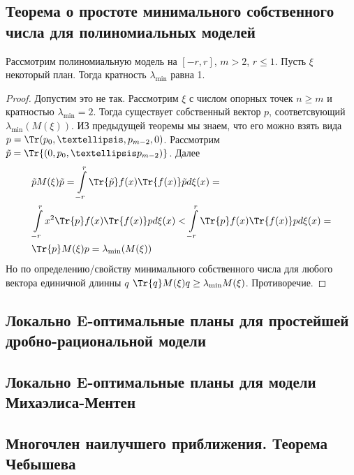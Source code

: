  \subsection{Теорема о простоте минимального собственного числа для полиномиальных моделей}
 \begin{thm}
Рассмотрим полиномиальную модель на  $[-r,r]$, $m > 2$, $r \leq 1$. Пусть $\xi$ некоторый план. Тогда кратность $\lambda_{\min}$ равна 1.
 \end{thm}
\begin{proof}
Допустим это не так. Рассмотрим $\xi$ с числом опорных точек $n \geq m$ и кратностью $\lambda_{\min} = 2$. Тогда 
существует собственный вектор $p$, соответсвующий $\lambda_{\min}(M(\xi))$. ИЗ предыдущей теоремы мы знаем, что его можно взять вида $p = \Tr(p_0, …, p_{m-2}, 0)$. Рассмотрим $\tilde{p} = \Tr{(0, p_0,…p_{m-2})}$. Далее
\begin{equation}
\begin{split}
&\tilde{p}M(\xi)\tilde{p} = \int\limits_{-r}^r \Tr{\tilde{p}} f(x) \Tr{f(x)} \tilde{p}d\xi(x) = \\
&\int\limits_{-r}^r x^2 \Tr{p} f(x)\Tr{f(x)} p d\xi(x) < \int  \limits_{-r}^r  \Tr{p} f(x)\Tr{f(x)} p d\xi(x)= \\
&\Tr{p}M(\xi)p = \lambda_{\min}(M(\xi))
 \end{split}
 \end{equation}
 Но по определению/свойству минимального собственного числа для любого вектора единичной длинны $q$
 $\Tr{q} M(\xi)q \geq \lambda_{\min}M(\xi)$. Противоречие.
\end{proof}

\subsection{Локально E-оптимальные планы для простейшей дробно-рациональной модели}

\subsection{Локально E-оптимальные планы для модели Михаэлиса-Ментен}

\subsection{Многочлен наилучшего приближения. Теорема Чебышева}

